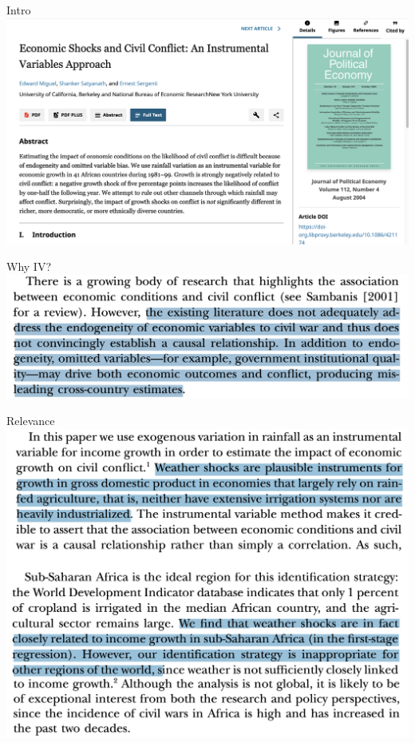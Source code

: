 \documentclass[11pt,xcolor=table]{beamer}
\begin{document}
\begin{frame}{Intro}
\includegraphics[width=\textwidth]{figures/IV Rain/iv_intro.png}

\end{frame}



\begin{frame}{Why IV?}
\includegraphics[width=\textwidth]{figures/IV Rain/whyiv.png}
\end{frame}


\begin{frame}{Relevance}
\includegraphics[width=\textwidth]{figures/IV Rain/relevance.png}
\end{frame}
\end{document}

